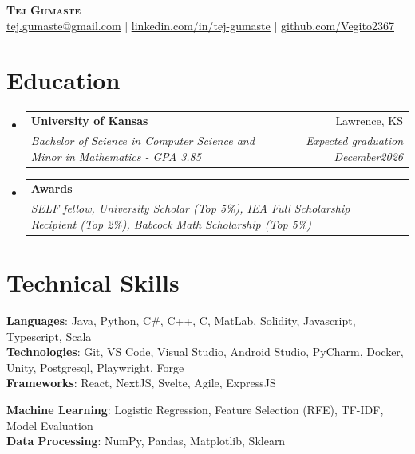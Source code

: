 \documentclass[letterpaper,10.5pt]{article}
\makeatletter
\newcommand{\resumeSubheading}[4]{
  \vspace{-2pt}\item
    \begin{tabular*}{0.97\textwidth}[t]{l@{\extracolsep{\fill}}r}
      \textbf{#1} & #2 \\
      \textit{\small#3} & \textit{\small #4} \\
    \end{tabular*}\vspace{-7pt}
}
\newcommand{\resumeSubHeadingListStart}{\begin{itemize}[leftmargin=0.15in, label={}]}
\newcommand{\resumeSubHeadingListEnd}{\end{itemize}}
\makeatother
\begin{document}
\begin{center}
    \textbf{\Huge \scshape Tej Gumaste} \\ \vspace{1pt}
    \small \href{mailto:tej.gumaste@gmail.com}{\underline{tej.gumaste@gmail.com}} $|$ 
    \href{https://www.linkedin.com/in/tej-gumaste/}{\underline{linkedin.com/in/tej-gumaste}} $|$
    \href{https://www.github.com/Vegito2367}{\underline{github.com/Vegito2367}}
\end{center}


\section{Education}
  \resumeSubHeadingListStart
    \resumeSubheading
      {University of Kansas}{Lawrence, KS}
      {Bachelor of Science in Computer Science and Minor in Mathematics - GPA 3.85} {Expected graduation December2026}
      \resumeSubheading
      {Awards}{}
      {SELF fellow, University Scholar (Top 5\%), IEA Full Scholarship Recipient (Top 2\%), Babcock Math Scholarship (Top 5\%)}{}

  \resumeSubHeadingListEnd

\section{Technical Skills}
 \begin{itemize}[leftmargin=0.15in, label={}]
    \small{\item{
     \textbf{Languages}{: Java, Python, C\#, C++, C, MatLab, Solidity, Javascript, Typescript, Scala} \\
     \textbf{Technologies}{: Git, VS Code, Visual Studio, Android Studio, PyCharm, Docker, Unity, Postgresql, Playwright, Forge} \\
     \textbf{Frameworks}{: React, NextJS, Svelte, Agile, ExpressJS}\\
    }}
    \textbf{Machine Learning}{: Logistic Regression, Feature Selection (RFE), TF-IDF, Model Evaluation}\\
     \textbf{Data Processing}{: NumPy, Pandas, Matplotlib, Sklearn}
    
    
 \end{itemize}
  
\end{document}
